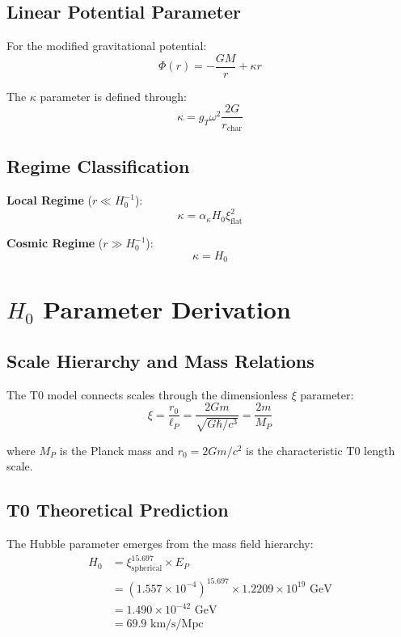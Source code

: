 \documentclass[12pt,a4paper]{article}
\begin{document}
	\subsection{Linear Potential Parameter}
	For the modified gravitational potential:
	\begin{equation}
		\Phi(r) = -\frac{GM}{r} + \kappa r
	\end{equation}
	
	The $\kappa$ parameter is defined through:
	\begin{equation}
		\kappa = g_T \omega^2 \frac{2G}{r_{\text{char}}}
	\end{equation}
	
	\subsection{Regime Classification}
	\textbf{Local Regime} ($r \ll H_0^{-1}$):
	\begin{equation}
		\kappa = \alpha_\kappa H_0 \xi_{\text{flat}}^2
	\end{equation}
	
	\textbf{Cosmic Regime} ($r \gg H_0^{-1}$):
	\begin{equation}
		\boxed{\kappa = H_0}
	\end{equation}
	
	\section{$H_0$ Parameter Derivation}
	
	\subsection{Scale Hierarchy and Mass Relations}
	The T0 model connects scales through the dimensionless $\xi$ parameter:
	\begin{equation}
		\xi = \frac{r_0}{\ell_P} = \frac{2Gm}{\sqrt{G\hbar/c^3}} = \frac{2m}{M_P}
	\end{equation}
	
	where $M_P$ is the Planck mass and $r_0 = 2Gm/c^2$ is the characteristic T0 length scale.
	
	\subsection{T0 Theoretical Prediction}
	The Hubble parameter emerges from the mass field hierarchy:
	\begin{align}
		H_0 &= \xi_{\text{spherical}}^{15.697} \times E_P \\
		&= (1.557 \times 10^{-4})^{15.697} \times 1.2209 \times 10^{19} \text{ GeV} \\
		&= 1.490 \times 10^{-42} \text{ GeV} \\
		&= \boxed{69.9 \text{ km/s/Mpc}}
	\end{align}
	
\end{document}
